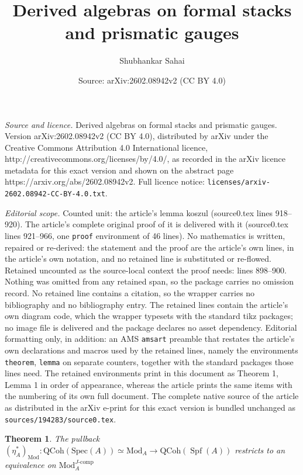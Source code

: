 \documentclass[10pt,a4paper]{amsart}
\title{Derived algebras on formal stacks and prismatic gauges}
\author{Shubhankar Sahai}
\date{Source: arXiv:2602.08942v2 (CC BY 4.0)}
\newtheorem{theorem}{Theorem}
\newcommand{\Mod}{\mathrm{Mod}}
\newcommand{\Qcoh}{\mathrm{QCoh}}
\newcommand{\jcomp}{{J\text{-}\mathrm{comp}}}
\newcommand{\spec}{{\mathrm{Spec}}}
\newcommand{\spf}{\operatorname{Spf}}
\begin{document}
\maketitle

\noindent\emph{Source and licence.} Derived algebras on formal stacks and prismatic gauges. Version arXiv:2602.08942v2 (CC BY 4.0), distributed by arXiv under the Creative Commons Attribution 4.0 International licence, http://creativecommons.org/licenses/by/4.0/, as recorded in the arXiv licence metadata for this exact version and shown on the abstract page https://arxiv.org/abs/2602.08942v2. Full licence notice: \texttt{licenses/arxiv-2602.08942-CC-BY-4.0.txt}.\par\smallskip

\noindent\textit{Editorial scope.} Counted unit: the article's lemma koszul (source0.tex lines 918--920). The article's complete original proof of it is delivered with it (source0.tex lines 921--966, one \texttt{proof} environment of 46 lines). No mathematics is written, repaired or re-derived: the statement and the proof are the article's own lines, in the article's own notation, and no retained line is substituted or re-flowed.  Retained uncounted as the source-local context the proof needs: lines 898--900.  Nothing was omitted from any retained span, so the package carries no omission record.  No retained line contains a citation, so the wrapper carries no bibliography and no bibliography entry.  The retained lines contain the article's own diagram code, which the wrapper typesets with the standard tikz packages; no image file is delivered and the package declares no asset dependency.  Editorial formatting only, in addition: an AMS \texttt{amsart} preamble that restates the article's own declarations and macros used by the retained lines, namely the environments \texttt{theorem}, \texttt{lemma} on separate counters, together with the standard packages those lines need.  The retained environments print in this document as Theorem 1, Lemma 1 in order of appearance, whereas the article prints the same items with the numbering of its own full document.  The complete native source of the article as distributed in the arXiv e-print for this exact version is bundled unchanged as \texttt{sources/194283/source0.tex}.
\begin{theorem}\label{thm: mod on spf}
    The pullback $(\eta_A^*)_{\Mod}\colon \Qcoh(\spec(A))\simeq \Mod_A\to  \Qcoh(\spf(A))$ restricts to an equivalence on $\Mod_A^\jcomp$
\end{theorem}
\end{document}
